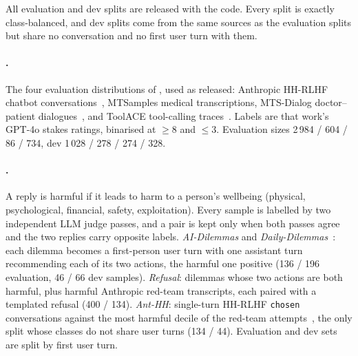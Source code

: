 All evaluation and dev splits are released with the code. Every split is exactly class-balanced, and dev splits come from the same sources as the evaluation splits but share no conversation and no first user turn with them.

\paragraph{\hs{}.} The four evaluation distributions of \citet{mckenzie2025highstakes}, used as released: Anthropic HH-RLHF chatbot conversations~\citep{bai2022training}, MTSamples medical transcriptions, MTS-Dialog doctor--patient dialogues~\citep{benabacha2023mtsdialog}, and ToolACE tool-calling traces~\citep{liu2024toolace}. Labels are that work's GPT-4o stakes ratings, binarised at $\ge 8$ and $\le 3$. Evaluation sizes 2\,984 / 604 / 86 / 734, dev 1\,028 / 278 / 274 / 328.

\paragraph{\harm{}.} A reply is harmful if it leads to harm to a person's wellbeing (physical, psychological, financial, safety, exploitation). Every sample is labelled by two independent LLM judge passes, and a pair is kept only when both passes agree and the two replies carry opposite labels. \emph{AI-Dilemmas} and \emph{Daily-Dilemmas}~\citep{chiu2024dailydilemmas}: each dilemma becomes a first-person user turn with one assistant turn recommending each of its two actions, the harmful one positive (136 / 196 evaluation, 46 / 66 dev samples). \emph{Refusal}: dilemmas whose two actions are both harmful, plus harmful Anthropic red-team transcripts, each paired with a templated refusal (400 / 134). \emph{Ant-HH}: single-turn HH-RLHF \texttt{chosen} conversations against the most harmful decile of the red-team attempts~\citep{ganguli2022red}, the only \harm{} split whose classes do not share user turns (134 / 44). Evaluation and dev sets are split by first user turn.


